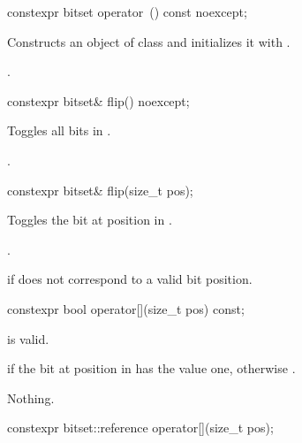 %
\begin{itemdecl}
constexpr bitset operator~() const noexcept;
\end{itemdecl}

\begin{itemdescr}
\pnum
\effects
Constructs an object  of class
and initializes it with
.

\pnum
\returns
{}.
\end{itemdescr}

%
\begin{itemdecl}
constexpr bitset& flip() noexcept;
\end{itemdecl}

\begin{itemdescr}
\pnum
\effects
Toggles all bits in
.

\pnum
\returns
{}.
\end{itemdescr}

%
\begin{itemdecl}
constexpr bitset& flip(size_t pos);
\end{itemdecl}

\begin{itemdescr}
\pnum
\effects
Toggles the bit at position  in
.

\pnum
\returns
{}.

\pnum
\throws
{}%
 if  does not correspond to a valid bit position.
\end{itemdescr}

%
\begin{itemdecl}
constexpr bool operator[](size_t pos) const;
\end{itemdecl}

\begin{itemdescr}
\pnum
\expects
{} is valid.

\pnum
\returns
{} if the bit at position  in  has the value
one, otherwise .

\pnum
\throws
Nothing.
\end{itemdescr}

%
\begin{itemdecl}
constexpr bitset::reference operator[](size_t pos);
\end{itemdecl}


